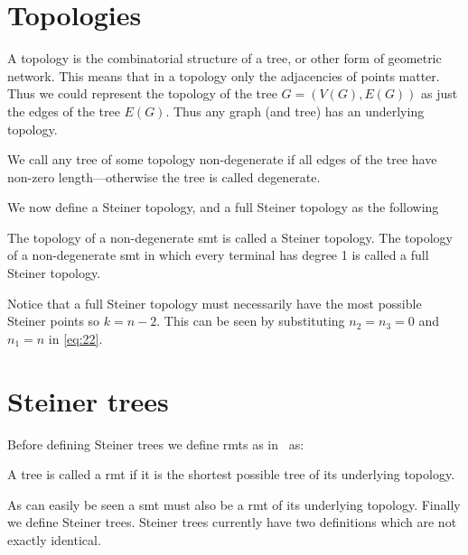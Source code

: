\section{Topologies}
\label{sec:topologies-1}

A topology is the combinatorial structure of a tree, or other form of geometric
network. This means that in a topology only the adjacencies of points
matter. Thus we could represent the topology of the tree $G = (V(G), E(G))$ as
just the edges of the tree $E(G)$. Thus any graph (and tree) has an
underlying topology.

We call any tree of some topology non-degenerate if all edges of the tree have
non-zero length---otherwise the tree is called degenerate.

We now define a Steiner topology, and a full Steiner topology as the following
%
\begin{definition}
The topology of a non-degenerate \ac{smt} is called a Steiner topology. The
topology of a non-degenerate \ac{smt} in which every terminal has degree 1 is
called a full Steiner topology.
\end{definition}
%
Notice that a full Steiner topology must necessarily have the most possible
Steiner points so $ k = n - 2$. This can be seen by substituting $n_2 = n_3 = 0$
and $n_1 = n$ in \cref{eq:22}.

\section{Steiner trees}
\label{sec:steiner-trees}

Before defining Steiner trees we define \acp{rmt} as in~\cite{gilbert1968}
as:
%
\begin{definition}
  A tree is called a \acl{rmt} if it is the shortest possible tree of its
  underlying topology.
\end{definition}
%
As can easily be seen a \ac{smt} must also be a \ac{rmt} of its underlying
topology. Finally we define Steiner trees. Steiner trees currently have two
definitions which are not exactly identical.

